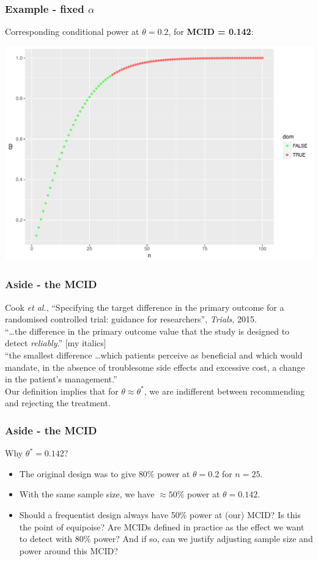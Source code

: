 \documentclass{beamer}
\begin{document}
\begin{frame}
\frametitle{Example - fixed $\alpha$}
Corresponding conditional power at $\theta=0.2$, for \textbf{MCID = 0.142}:

\centering
\includegraphics[scale=0.4]{pow_142}

\end{frame}

\begin{frame}
\frametitle{Aside - the MCID}
Cook \emph{et al.}, ``Specifying the target difference in the primary outcome for a randomised controlled trial: guidance for researchers'', \emph{Trials}, 2015.\\
\vspace{3mm}
``\ldots the difference in the primary outcome value that the study is designed to detect \emph{reliably}.'' [my italics]\\
\vspace{3mm}
``the smallest difference \ldots which patients perceive as beneficial and which would mandate, in the absence of troublesome side effects and excessive cost, a change in the patient's management.''\\
\vspace{3mm}
Our definition implies that for $\theta \approx \theta^{*}$, we are indifferent between recommending and rejecting the treatment.
\end{frame}

\begin{frame}
\frametitle{Aside - the MCID}
Why $\theta^{*} = 0.142$?

\begin{itemize}
\item The original design was to give 80\% power at $\theta = 0.2$ for $n = 25$.
\item With the same sample size, we have $\approx 50$\% power at $\theta = 0.142$.
\item Should a frequentist design always have 50\% power at (our) MCID? Is this the point of equipoise? Are MCIDs defined in practice as the effect we want to detect with 80\% power? And if so, can we justify adjusting sample size and power around this MCID?
\end{itemize}
\end{frame}
\end{document}
